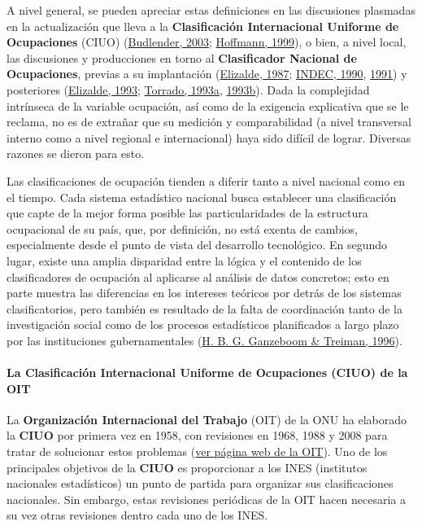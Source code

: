\documentclass[
]{article}
\begin{document}
A nivel general, se pueden apreciar estas definiciones en las discusiones plasmadas en la actualización que lleva a la \textbf{Clasificación Internacional Uniforme de Ocupaciones} (CIUO) (\protect\hyperlink{ref-Budlender2003}{Budlender, 2003}; \protect\hyperlink{ref-Hoffmann1999}{Hoffmann, 1999}), o bien, a nivel local, las discusiones y producciones en torno al \textbf{Clasificador Nacional de Ocupaciones}, previas a su implantación (\protect\hyperlink{ref-Elizalde1987}{Elizalde, 1987}; \protect\hyperlink{ref-INDEC1990}{INDEC, 1990}, \protect\hyperlink{ref-INDEC1991}{1991}) y posteriores (\protect\hyperlink{ref-Elizalde1993}{Elizalde, 1993}; \protect\hyperlink{ref-Torrado1993}{Torrado, 1993a}, \protect\hyperlink{ref-Torrado1993a}{1993b}). Dada la complejidad intrínseca de la variable ocupación, así como de la exigencia explicativa que se le reclama, no es de extrañar que su medición y comparabilidad (a nivel transversal interno como a nivel regional e internacional) haya sido difícil de lograr. Diversas razones se dieron para esto.

Las clasificaciones de ocupación tienden a diferir tanto a nivel nacional como en el tiempo. Cada sistema estadístico nacional busca establecer una clasificación que capte de la mejor forma posible las particularidades de la estructura ocupacional de su país, que, por definición, no está exenta de cambios, especialmente desde el punto de vista del desarrollo tecnológico. En segundo lugar, existe una amplia disparidad entre la lógica y el contenido de los clasificadores de ocupación al aplicarse al análisis de datos concretos; esto en parte muestra las diferencias en los intereses teóricos por detrás de los sistemas clasificatorios, pero también es resultado de la falta de coordinación tanto de la investigación social como de los procesos estadísticos planificados a largo plazo por las instituciones gubernamentales (\protect\hyperlink{ref-Ganzeboom1996}{H. B. G. Ganzeboom \& Treiman, 1996}).

\hypertarget{la-clasificaciuxf3n-internacional-uniforme-de-ocupaciones-ciuo-de-la-oit}{%
\paragraph{La Clasificación Internacional Uniforme de Ocupaciones (CIUO) de la OIT}\label{la-clasificaciuxf3n-internacional-uniforme-de-ocupaciones-ciuo-de-la-oit}}

La \textbf{Organización Internacional del Trabajo} (OIT) de la ONU ha elaborado la \textbf{CIUO} por primera vez en 1958, con revisiones en 1968, 1988 y 2008 para tratar de solucionar estos problemas (\href{https://www.ilo.org/public/spanish/bureau/stat/isco/}{ver página web de la OIT}). Uno de los principales objetivos de la \textbf{CIUO} es proporcionar a los INES (institutos nacionales estadísticos) un punto de partida para organizar sus clasificaciones nacionales. Sin embargo, estas revisiones periódicas de la OIT hacen necesaria a su vez otras revisiones dentro cada uno de los INES.
\end{document}
